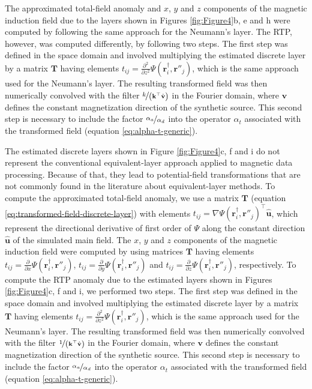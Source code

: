 \documentclass[manuscript,noblind]{geophysics}
\begin{document}
	The approximated total-field anomaly and $x$, $y$ and $z$ components of the magnetic induction field 
	due to the layers shown in Figures \ref{fig:Figure4}b, e and h were computed 
	by following the same approach for the Neumann's layer. 
	The RTP, however, was computed differently, by following two steps. 
	The first step was defined in the space domain and involved multiplying the estimated discrete layer 
	by a matrix $\mathbf{T}$ 
	having elements $t_{ij} = \tfrac{\partial^{2}}{\partial z^{2}} \Psi(\mathbf{r}^{\dagger}_{i}, \mathbf{r}''_{j})$,
	which is the same approach used for the Neumann's layer. 
	The resulting transformed field was then numerically convolved with the filter $\nicefrac{k}{\left(\mathbf{k}^{\top} \hat{\mathbf{v}} \right)}$ 
	in the Fourier domain, where $\mathbf{v}$ defines the constant magnetization direction of the synthetic source.
	This second step is necessary to include the factor $\nicefrac{\alpha_{a}}{\alpha_{d}}$ into the operator 
	$\alpha_{t}$ associated with the transformed field (equation \ref{eq:alpha-t-generic}).
	
	The estimated discrete layers shown in Figure \ref{fig:Figure4}c, f and i do not represent the conventional 
	equivalent-layer approach applied to magnetic data processing.
	Because of that, they lead to potential-field transformations that are not commonly 
	found in the literature about equivalent-layer methods.
	To compute the approximated total-field anomaly, we use a matrix $\mathbf{T}$ (equation \ref{eq:transformed-field-discrete-layer}) 
	with elements $t_{ij} = \nabla \Psi(\mathbf{r}^{\dagger}_{i}, \mathbf{r}''_{j})^{\top} \hat{\mathbf{u}}$, 
	which represent the directional derivative of first order of $\Psi$ along the constant direction $\hat{\mathbf{u}}$ 
	of the simulated main field.
	The $x$, $y$ and $z$ components of the magnetic induction field were computed by using matrices $\mathbf{T}$
	having elements $t_{ij} = \tfrac{\partial}{\partial x} \Psi(\mathbf{r}^{\dagger}_{i}, \mathbf{r}''_{j})$, 
	$t_{ij} = \tfrac{\partial}{\partial y} \Psi(\mathbf{r}^{\dagger}_{i}, \mathbf{r}''_{j})$ and 
	$t_{ij} = \tfrac{\partial}{\partial z} \Psi(\mathbf{r}^{\dagger}_{i}, \mathbf{r}''_{j})$, respectively.
	To compute the RTP anomaly due to the estimated layers shown in Figures \ref{fig:Figure4}c, f and i, we performed two steps. 
	The first step was defined in the space domain and involved multiplying the estimated discrete layer 
	by a matrix $\mathbf{T}$ 
	having elements $t_{ij} = \tfrac{\partial^{2}}{\partial z^{2}} \Psi(\mathbf{r}^{\dagger}_{i}, \mathbf{r}''_{j})$,
	which is the same approach used for the Neumann's layer. 
	The resulting transformed field was then numerically convolved with the filter $\nicefrac{1}{\left(\mathbf{k}^{\top} \hat{\mathbf{v}} \right)}$ 
	in the Fourier domain, where $\mathbf{v}$ defines the constant magnetization direction of the synthetic source.
	This second step is necessary to include the factor $\nicefrac{\alpha_{a}}{\alpha_{d}}$ into the operator 
	$\alpha_{t}$ associated with the transformed field (equation \ref{eq:alpha-t-generic}).
	
\end{document}
